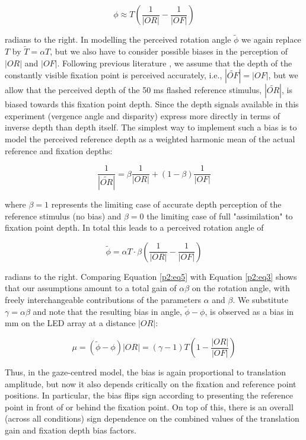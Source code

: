 \begin{equation}
\label{p2:eq3}
\phi \approx T (\frac{1}{|OR|} - \frac{1}{|OF|})
\end{equation}

radians to the right. In modelling the perceived rotation angle $\tilde{\phi}$ we again replace $T$ by $\tilde{T} = {\alpha}T$, but we also have to consider possible biases in the perception of $|OR|$ and $|OF|$. Following previous literature \cite{gogel1977, medendorp2003b}, we assume that the depth of the constantly visible fixation point is perceived accurately, i.e., $|\tilde{OF}| = |OF|$, but we allow that the perceived depth of the 50 ms flashed reference stimulus, $|\tilde{OR}|$, is biased towards this fixation point depth. Since the depth signals available in this experiment (vergence angle and disparity) express more directly in terms of inverse depth than depth itself. The simplest way to implement such a bias is to model the perceived reference depth as a weighted harmonic mean of the actual reference and fixation depths:

\begin{equation}
\label{p2:eq4}
\frac{1}{|\tilde{OR}|} = \beta \frac{1}{|OR|} + (1 - \beta) \frac{1}{|OF|}
\end{equation}

where $\beta = 1$ represents the limiting case of accurate depth perception of the reference stimulus (no bias) and $\beta = 0$ the limiting case of full "assimilation" to fixation point depth. In total this leads to a perceived rotation angle of

\begin{equation}
\label{p2:eq5}
\tilde{\phi} = {\alpha}T \cdot \beta(\frac{1}{|OR|} - \frac{1}{|OF|})
\end{equation}

radians to the right. Comparing Equation \ref{p2:eq5} with Equation \ref{p2:eq3} shows that our assumptions amount to a total gain of $\alpha\beta$ on the rotation angle, with freely interchangeable contributions of the parameters $\alpha$ and $\beta$. We substitute $\gamma = \alpha\beta$ and note that the resulting bias in angle, $\tilde{\phi} - \phi$, is observed as a bias in mm on the LED array at a distance $|OR|$:

\begin{equation}
\label{p2:eq6}
\mu = (\tilde{\phi} - \phi)|OR| = (\gamma - 1)T(1 - \frac{|OR|}{|OF|})
\end{equation}

Thus, in the gaze-centred model, the bias is again proportional to translation amplitude, but now it also depends critically on the fixation and reference point positions. In particular, the bias flips sign according to presenting the reference point in front of or behind the fixation point. On top of this, there is an overall (across all conditions) sign dependence on the combined values of the translation gain and fixation depth bias factors.


